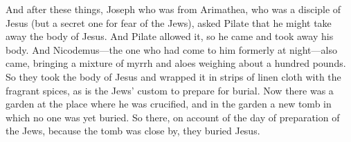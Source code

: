 \begin{biblechapter}
 And after these things, Joseph who was from Arimathea, who was a disciple of Jesus (but a secret one for fear of the Jews), asked Pilate that he might take away the body of Jesus. And Pilate allowed it, so he came and took away his body.
\verse And Nicodemus—the one who had come to him formerly at night—also came, bringing a mixture of myrrh and aloes weighing about a hundred pounds.
\verse So they took the body of Jesus and wrapped it in strips of linen cloth with the fragrant spices, as is the Jews’ custom to prepare for burial.
\verse Now there was a garden at the place where he was crucified, and in the garden a new tomb in which no one was yet buried.
\verse So there, on account of the day of preparation of the Jews, because the tomb was close by, they buried Jesus.
\end{biblechapter}

